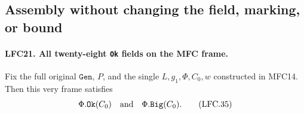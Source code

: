 \documentclass[11pt,a4paper]{article}
\numberwithin{equation}{section}
\theoremstyle{remark}\newtheorem{remark}[theorem]{Remark}
\begin{document}
\subsection{Assembly without changing the field, marking, or bound}

\paragraph{LFC21. All twenty-eight \texttt{Ok} fields on the MFC frame.}
\label{claim:LFC21}
Fix the full original \(\texttt{Gen}\), \(P\), and the
single \(L,g_1,\Phi,C_0,w\) constructed in MFC14.
Then this very frame satisfies
\[
                         \Phi.\texttt{Ok}(C_0)
                    \quad\hbox{and}\quad
                         \Phi.\texttt{Big}(C_0).          \tag{LFC.35}
\]
\end{document}
